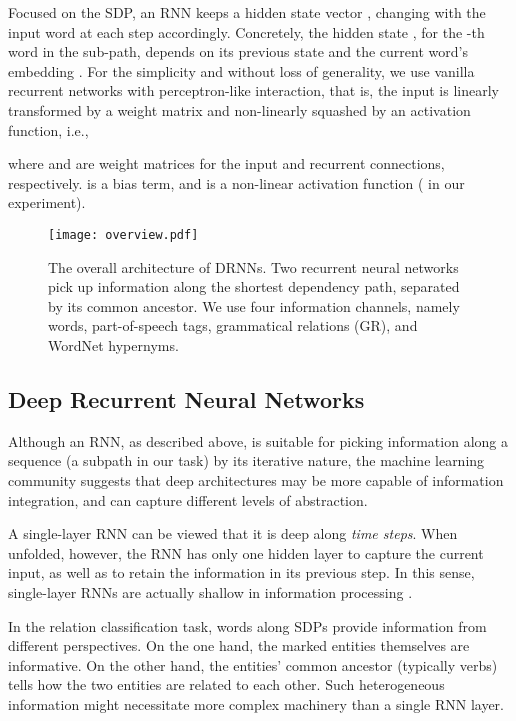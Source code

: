 \documentclass[11pt]{article}
\begin{document}
Focused on the SDP, an RNN keeps a hidden state vector , changing with the input word at each step accordingly.
Concretely, the hidden state , for the -th word in the sub-path, depends on its previous state  and the current word's embedding . For the simplicity and without loss of generality, we use vanilla recurrent networks with perceptron-like interaction, that is, the input is linearly transformed by a weight matrix and non-linearly squashed by an activation function, i.e.,

where  and  are weight matrices for the input and recurrent connections, respectively.
 is a bias term, and  is a non-linear activation function ( in our experiment).
\begin{figure*}
\centering
\bigskip
\texttt{[image: overview.pdf]}
\caption{The overall architecture of DRNNs.
Two recurrent neural networks pick up information along the shortest dependency path, separated by its common ancestor. We use four information channels, namely words, part-of-speech tags, grammatical relations (GR), and WordNet hypernyms.}\label{fArchitecture}
\end{figure*}


\subsection{Deep Recurrent Neural Networks}\label{ssDeepRNN}

Although an RNN, as described above, is suitable for picking information along a sequence (a subpath in our task) by its iterative nature, the machine learning community suggests that deep architectures may be more capable of information integration, and can capture different levels of abstraction.

A single-layer RNN can be viewed that it is deep along \textit{time steps}. When unfolded, however, the RNN has only one hidden layer to capture the current input, as well as to retain the information in its previous step. In this sense, single-layer RNNs are actually shallow in information processing \cite{TrainDRNN,OpinionDRNN}.

In the relation classification task, words along SDPs provide information from different perspectives. On the one hand, the marked entities themselves are informative. On the other hand, the entities' common ancestor (typically verbs) tells how the two entities are related to each other. Such heterogeneous information might necessitate more complex machinery than a single RNN layer.
\end{document}
